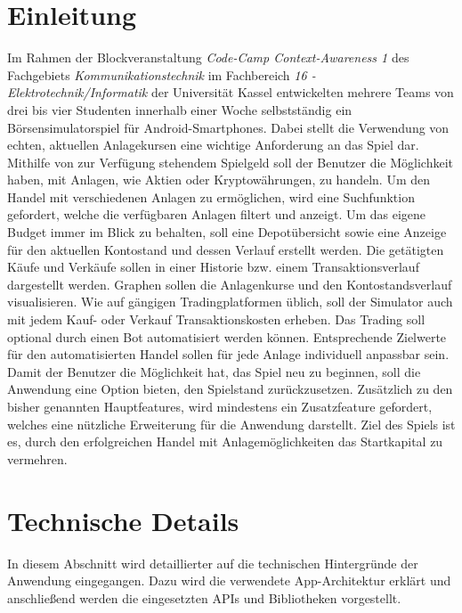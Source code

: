 \documentclass[a4paper]{article}
\begin{document}
\section{Einleitung}
\label{sec:introduction}
Im Rahmen der Blockveranstaltung \textit{Code-Camp Context-Awareness 1} des Fachgebiets \textit{Kommunikationstechnik} im Fachbereich \textit{16 - Elektrotechnik/Informatik} der Universität Kassel entwickelten mehrere Teams von drei bis vier Studenten innerhalb einer Woche selbstständig ein Börsensimulatorspiel für Android-Smartphones. Dabei stellt die Verwendung von echten, aktuellen Anlagekursen eine wichtige Anforderung an das Spiel dar. Mithilfe von zur Verfügung stehendem Spielgeld soll der Benutzer die Möglichkeit haben, mit Anlagen, wie Aktien oder Kryptowährungen, zu handeln. Um den Handel mit verschiedenen Anlagen zu ermöglichen, wird eine Suchfunktion gefordert, welche die verfügbaren Anlagen filtert und anzeigt. Um das eigene Budget immer im Blick zu behalten, soll eine Depotübersicht sowie eine Anzeige für den aktuellen Kontostand und dessen Verlauf erstellt werden. Die getätigten Käufe und Verkäufe sollen in einer Historie bzw. einem Transaktionsverlauf dargestellt werden. Graphen sollen die Anlagenkurse und den Kontostandsverlauf visualisieren. Wie auf gängigen Tradingplatformen üblich, soll der Simulator auch mit jedem Kauf- oder Verkauf Transaktionskosten erheben. Das Trading soll optional durch einen Bot automatisiert werden können. Entsprechende Zielwerte für den automatisierten Handel sollen für jede Anlage individuell anpassbar sein. Damit der Benutzer die Möglichkeit hat, das Spiel neu zu beginnen, soll die Anwendung eine Option bieten, den Spielstand zurückzusetzen. Zusätzlich zu den bisher genannten Hauptfeatures, wird mindestens ein Zusatzfeature gefordert, welches eine nützliche Erweiterung für die Anwendung darstellt. Ziel des Spiels ist es, durch den erfolgreichen Handel mit Anlagemöglichkeiten das Startkapital zu vermehren.


\section{Technische Details}
\label{sec:technologies}
In diesem Abschnitt wird detaillierter auf die technischen Hintergründe der Anwendung eingegangen. Dazu wird die verwendete App-Architektur erklärt und anschließend werden die eingesetzten APIs und Bibliotheken vorgestellt.
\end{document}
